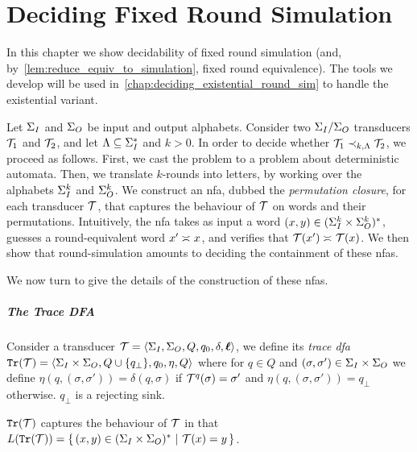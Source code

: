 \chapter{Deciding Fixed Round Simulation}
\label{chap:deciding_fixed_round_sim}

In this chapter we show decidability of fixed round simulation (and, by~\cref{lem:reduce_equiv_to_simulation}, fixed round equivalence). The tools we develop will be used in~\cref{chap:deciding_existential_round_sim} to handle the existential variant.

Let $\Sigma_{I}$ and $\Sigma_{O}$ be input and output alphabets. Consider two $\Sigma_{I}/\Sigma_{O}$ transducers $\mathcal{T}_1$ and $\mathcal{T}_2$, and let $\Lambda\subseteq \Sigma_{I}^*$ and $k>0$.
In order to decide whether $\mathcal{T}_1\prec_{k,\Lambda} \mathcal{T}_2$, we proceed as follows. First, we cast the problem to a problem about deterministic automata. Then, we translate $k$-rounds into letters, by working over the alphabets $\Sigma_{I}^k$ and $\Sigma_{O}^k$. We construct an \gls{nfa}, dubbed the \emph{permutation closure}, for each transducer $\mathcal{T}$, that captures the behaviour of $\mathcal{T}$ on words and their permutations. Intuitively, the \gls{nfa} takes as input a word $(x,y)\in (\Sigma_{I}^{k}\times \Sigma_{O}^k)^*$, guesses a round-equivalent word $x'\asymp_{} x$, and verifies that $\mathcal{T}(x')\asymp_{} \mathcal{T}(x)$. We then show that round-simulation amounts to deciding the containment of these \glspl{nfa}.

We now turn to give the details of the construction of these \glspl{nfa}.

\paragraph{The Trace \bf DFA} Consider a transducer $\mathcal{T}=\left< \Sigma_{I},\Sigma_{O},Q,q_0,\delta,\boldsymbol{\ell}\right>$, we define its \emph{trace \gls{dfa}} ${\mathtt{Tr}}(\mathcal{T})=\left< \Sigma_{I}\times\Sigma_{O},Q\cup\{q_{\bot}\},q_0,\eta,Q\right>$ where for $q\in Q$ and $(\sigma,\sigma')\in \Sigma_{I}\times \Sigma_{O}$ we define $\eta(q,(\sigma,\sigma'))=\delta(q,\sigma)$ if $\mathcal{T}^{q}(\sigma)=\sigma'$ and $\eta(q,(\sigma,\sigma'))=q_{\bot}$ otherwise.
$q_\bot$ is a rejecting sink. 

${\mathtt{Tr}}(\mathcal{T})$ captures the behaviour of $\mathcal{T}$ in that $L({\mathtt{Tr}}(\mathcal{T}))=\left\{\,(x,y)\in (\Sigma_{I}\times \Sigma_{O})^*\ \middle|\ \mathcal{T}(x)=y\,\right\}$. 

